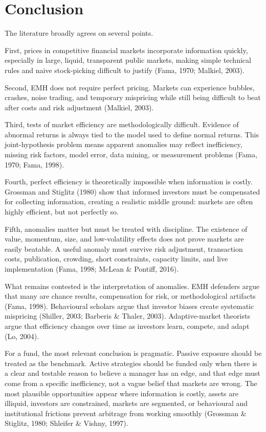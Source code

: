 \documentclass[11pt,a4paper]{article}
\begin{document}
\section{Conclusion}

The literature broadly agrees on several points.

First, prices in competitive financial markets incorporate information quickly, especially in large, liquid, transparent public markets, making simple technical rules and naive stock-picking difficult to justify (Fama, 1970; Malkiel, 2003).

Second, EMH does not require perfect pricing. Markets can experience bubbles, crashes, noise trading, and temporary mispricing while still being difficult to beat after costs and risk adjustment (Malkiel, 2003).

Third, tests of market efficiency are methodologically difficult. Evidence of abnormal returns is always tied to the model used to define normal returns. This joint-hypothesis problem means apparent anomalies may reflect inefficiency, missing risk factors, model error, data mining, or measurement problems (Fama, 1970; Fama, 1998).

Fourth, perfect efficiency is theoretically impossible when information is costly. Grossman and Stiglitz (1980) show that informed investors must be compensated for collecting information, creating a realistic middle ground: markets are often highly efficient, but not perfectly so.

Fifth, anomalies matter but must be treated with discipline. The existence of value, momentum, size, and low-volatility effects does not prove markets are easily beatable. A useful anomaly must survive risk adjustment, transaction costs, publication, crowding, short constraints, capacity limits, and live implementation (Fama, 1998; McLean \& Pontiff, 2016).

What remains contested is the interpretation of anomalies. EMH defenders argue that many are chance results, compensation for risk, or methodological artifacts (Fama, 1998). Behavioural scholars argue that investor biases create systematic mispricing (Shiller, 2003; Barberis \& Thaler, 2003). Adaptive-market theorists argue that efficiency changes over time as investors learn, compete, and adapt (Lo, 2004).

For a fund, the most relevant conclusion is pragmatic. Passive exposure should be treated as the benchmark. Active strategies should be funded only when there is a clear and testable reason to believe a manager has an edge, and that edge must come from a specific inefficiency, not a vague belief that markets are wrong. The most plausible opportunities appear where information is costly, assets are illiquid, investors are constrained, markets are segmented, or behavioural and institutional frictions prevent arbitrage from working smoothly (Grossman \& Stiglitz, 1980; Shleifer \& Vishny, 1997).
\end{document}
